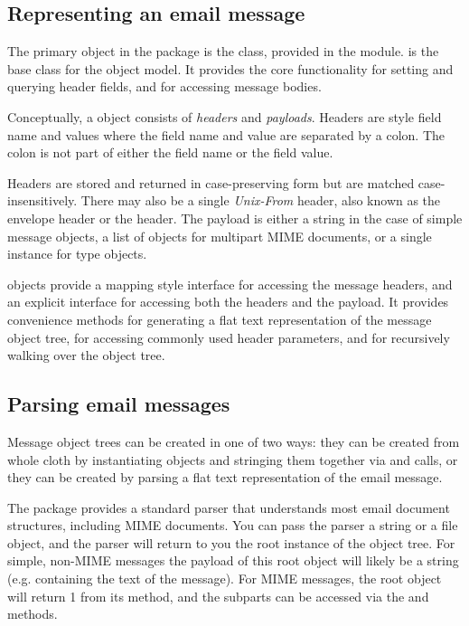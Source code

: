 \subsection{Representing an email message}

The primary object in the  package is the
 class, provided in the 
module.   is the base class for the 
object model.  It provides the core functionality for setting and
querying header fields, and for accessing message bodies.

Conceptually, a  object consists of \emph{headers} and
\emph{payloads}.  Headers are  style field name and
values where the field name and value are separated by a colon.  The
colon is not part of either the field name or the field value.

Headers are stored and returned in case-preserving form but are
matched case-insensitively.  There may also be a single
\emph{Unix-From} header, also known as the envelope header or the
 header.  The payload is either a string in the case of
simple message objects, a list of  objects for
multipart MIME documents, or a single  instance for
 type objects.

 objects provide a mapping style interface for
accessing the message headers, and an explicit interface for accessing
both the headers and the payload.  It provides convenience methods for
generating a flat text representation of the message object tree, for
accessing commonly used header parameters, and for recursively walking
over the object tree.

\subsection{Parsing email messages}
Message object trees can be created in one of two ways: they can be
created from whole cloth by instantiating  objects and
stringing them together via  and
 calls, or they can be created by parsing a flat text
representation of the email message.

The  package provides a standard parser that understands
most email document structures, including MIME documents.  You can
pass the parser a string or a file object, and the parser will return
to you the root  instance of the object tree.  For
simple, non-MIME messages the payload of this root object will likely
be a string (e.g. containing the text of the message).  For MIME
messages, the root object will return 1 from its
 method, and the subparts can be accessed via
the  and  methods.

